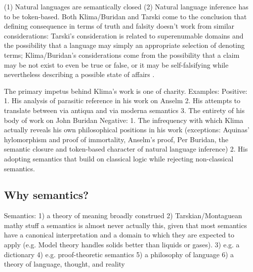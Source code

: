 \documentclass[]{article}
\begin{document}

(1) Natural languages are semantically closed (2) Natural language inference has to be token-based.
Both Klima/Buridan and Tarski come to the conclusion that defining consequence in terms of truth and falsity doesn't work from similar considerations: Tarski's consideration is related to superenumable domains and the possibility that a language may simply an appropriate selection of denoting terms; Klima/Buridan's considerations come from the possibility that a claim may be not exist to even be true or false, or it may be self-falsifying while nevertheless describing a possible state of affairs \autocite[96]{Klima2004}.

The primary impetus behind Klima's work is one of charity.
Examples: 
Positive:
1. His analysis of parasitic reference in his work on Anselm
2. His attempts to translate between via antiqua and via moderna semantics
3. The entirety of his body of work on John Buridan
Negative:
1. The infrequency with which Klima actually reveals his own philosophical positions in his work (exceptions: 
Aquinas' hylomorphism and proof of immortality, 
Anselm's proof, 
Per Buridan, the semantic closure and token-based character of natural language inference)
2. His adopting semantics that build on classical logic while rejecting non-classical semantics.




\subsection{Why semantics?}
Semantics: 
1) a theory of meaning broadly construed
2) Tarskian/Montaguean mathy stuff
a semantics is almost never actually this, given that most semantics have a canonical interpretation and a domain to which they are expected to apply (e.g. Model theory handles solids better than liquids or gases).
3) e.g. a dictionary
4) e.g. proof-theoretic semantics
5) a philosophy of language
6) a theory of language, thought, and reality
\end{document}
